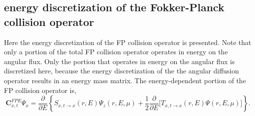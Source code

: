 \subsection{\dG energy discretization of the Fokker-Planck collision operator}
Here the \dG energy discretization of the FP collision operator is presented. Note that only a portion of the total FP collision operator operates in energy on the angular flux. Only the portion that operates in energy on the angular flux is discretized here, because the \dG energy discretization  of the the angular diffusion operator results in an energy mass matrix. The energy-dependent portion of the FP collision operator is,
\begin{equation} \label{eqn:FP_energy_dependent}
    \boldsymbol{C}_{x,t}^{FPE} \Psi_x = \dfrac{\partial}{\partial E} \left\lbrace S_{x,t\rightarrow x}(r,E) \Psi_z(r,E,\mu)  + \dfrac{1}{2} \dfrac{\partial}{\partial E} \Big[ T_{x,t\rightarrow x}(r,E) \Psi(r,E,\mu) \Big] \right\rbrace.
\end{equation}

